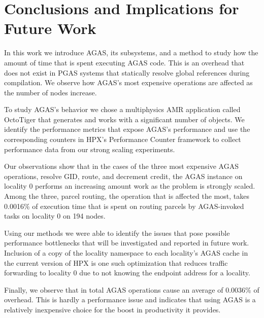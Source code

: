 \section{Conclusions and Implications for Future Work}
\label{conclusions}

%

In this work we introduce AGAS, its subsystems, and a method to study how the
amount of time that is spent executing AGAS code. This is an overhead that does
not exist in PGAS systems that statically resolve global references during
compilation. We observe how AGAS's most expensive operations are affected as
the number of nodes increase.

To study AGAS's behavior we chose a multiphysics AMR application called
OctoTiger that generates and works with a significant number of objects. We
identify the performance metrics that expose AGAS's performance and use the
corresponding counters in HPX's Performance Counter framework to collect
performance data from our strong scaling experiments.

Our observations show that in the cases of the three most expensive AGAS operations, resolve
GID, route, and decrement credit, the AGAS instance on locality 0 performs an
increasing amount work as the problem is strongly scaled. Among the three, parcel routing, the operation that is
affected the most, takes 0.0016\% of
execution time that is spent on routing parcels by AGAS-invoked tasks on locality 0 on
194 nodes. 

Using our methods we were able to identify the issues that pose possible
performance bottlenecks that will be investigated and reported in future work. Inclusion of a copy
of the locality namespace to each locality's AGAS cache in the current version
of HPX is one such optimization that reduces traffic forwarding to locality 0
due to not knowing the endpoint address for a locality.

Finally, we observe that in total AGAS operations cause an average of 0.0036\%
of overhead. This is hardly a performance issue and indicates that using AGAS
is a relatively inexpensive choice for the boost in productivity it provides.
